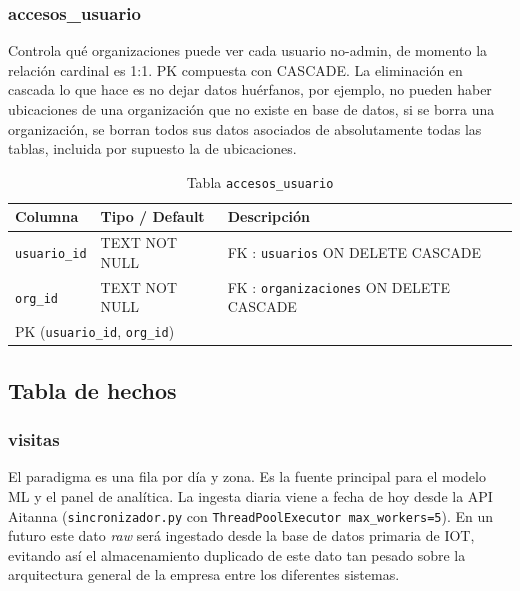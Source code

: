 \documentclass[12pt, a4paper]{article}
\begin{document}
\subsubsection{accesos\_usuario}

Controla qué organizaciones puede ver cada usuario no-admin, de momento la relación cardinal es 1:1. PK compuesta con CASCADE. La eliminación en cascada lo que hace es no dejar datos huérfanos, por ejemplo, no pueden haber ubicaciones de una organización que no existe en base de datos, si se borra una organización, se borran todos sus datos asociados de absolutamente todas las tablas, incluida por supuesto la de ubicaciones.

\begin{table}[H]
\centering
\renewcommand{\arraystretch}{1.2}
\begin{tabular}{llp{5.5cm}}
\toprule
\textbf{Columna} & \textbf{Tipo / Default} & \textbf{Descripción} \\
\midrule
\texttt{usuario\_id} & TEXT NOT NULL & FK : \texttt{usuarios} ON DELETE CASCADE \\
\texttt{org\_id}     & TEXT NOT NULL & FK : \texttt{organizaciones} ON DELETE CASCADE \\
\multicolumn{3}{l}{PK (\texttt{usuario\_id}, \texttt{org\_id})} \\
\bottomrule
\end{tabular}
\caption{Tabla \texttt{accesos\_usuario}}
\end{table}

\subsection{Tabla de hechos}

\subsubsection{visitas}

El paradigma es una fila por día y zona. Es la fuente principal para el modelo ML y el panel de analítica. La ingesta diaria viene a fecha de hoy desde la API Aitanna (\texttt{sincronizador.py} con \texttt{ThreadPoolExecutor max\_workers=5}). En un futuro este dato \textit{raw}  será ingestado desde la base de datos primaria de IOT, evitando así el almacenamiento duplicado de este dato tan pesado sobre la arquitectura general de la empresa entre los diferentes sistemas.
\end{document}
